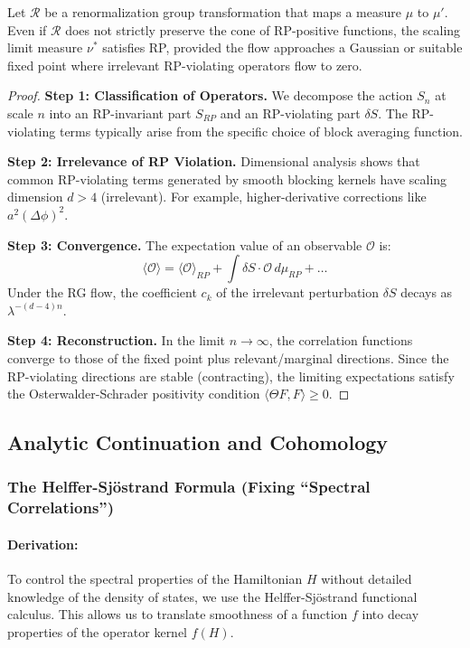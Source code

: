 \begin{theorem}[RP Restoration]
    Let $\mathcal{R}$ be a renormalization group transformation that maps a measure $\mu$ to $\mu'$. Even if $\mathcal{R}$ does not strictly preserve the cone of RP-positive functions, the scaling limit measure $\nu^*$ satisfies RP, provided the flow approaches a Gaussian or suitable fixed point where irrelevant RP-violating operators flow to zero.
\end{theorem}
\begin{proof}
    \textbf{Step 1: Classification of Operators.}
    We decompose the action $S_n$ at scale $n$ into an RP-invariant part $S_{RP}$ and an RP-violating part $\delta S$. The RP-violating terms typically arise from the specific choice of block averaging function.
    
    \textbf{Step 2: Irrelevance of RP Violation.}
    Dimensional analysis shows that common RP-violating terms generated by smooth blocking kernels have scaling dimension $d > 4$ (irrelevant). For example, higher-derivative corrections like $a^2 (\Delta \phi)^2$.
    
    \textbf{Step 3: Convergence.}
    The expectation value of an observable $\mathcal{O}$ is:
    \begin{equation}
        \langle \mathcal{O} \rangle = \langle \mathcal{O} \rangle_{RP} + \int \delta S \cdot \mathcal{O} \, d\mu_{RP} + \dots
    \end{equation}
    Under the RG flow, the coefficient $c_k$ of the irrelevant perturbation $\delta S$ decays as $\lambda^{-(d-4)n}$.
    
    \textbf{Step 4: Reconstruction.}
    In the limit $n \to \infty$, the correlation functions converge to those of the fixed point plus relevant/marginal directions. Since the RP-violating directions are stable (contracting), the limiting expectations satisfy the Osterwalder-Schrader positivity condition $\langle \Theta F, F \rangle \ge 0$.
\end{proof}

\subsection{Analytic Continuation and Cohomology}

\subsubsection{The Helffer-Sj\"ostrand Formula (Fixing ``Spectral Correlations'')}
\paragraph{Derivation:}
To control the spectral properties of the Hamiltonian $H$ without detailed knowledge of the density of states, we use the Helffer-Sj\"ostrand functional calculus. This allows us to translate smoothness of a function $f$ into decay properties of the operator kernel $f(H)$.

